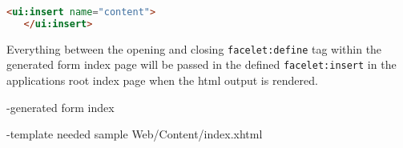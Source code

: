  \begin{lstlisting}[language=HTML] 
   <ui:insert name="content">
   </ui:insert>
  \end{lstlisting}
 
 Everything between the opening and closing \texttt{facelet:define} tag within
 the generated form index page will be passed in the defined
 \texttt{facelet:insert} in the applications root index page when the html
 output is rendered.
 
  -generated form index

-template needed sample Web/Content/index.xhtml